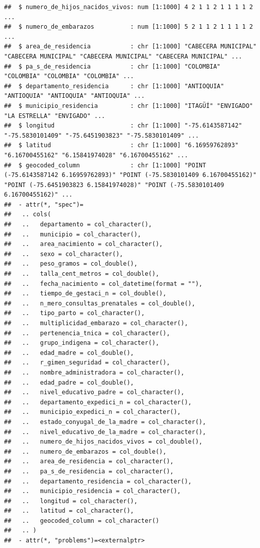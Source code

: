 \documentclass[
]{book}
\begin{document}
\begin{verbatim}
##  $ numero_de_hijos_nacidos_vivos: num [1:1000] 4 2 1 1 2 1 1 1 1 2 ...
##  $ numero_de_embarazos          : num [1:1000] 5 2 1 1 2 1 1 1 1 2 ...
##  $ area_de_residencia           : chr [1:1000] "CABECERA MUNICIPAL" "CABECERA MUNICIPAL" "CABECERA MUNICIPAL" "CABECERA MUNICIPAL" ...
##  $ pa_s_de_residencia           : chr [1:1000] "COLOMBIA" "COLOMBIA" "COLOMBIA" "COLOMBIA" ...
##  $ departamento_residencia      : chr [1:1000] "ANTIOQUIA" "ANTIOQUIA" "ANTIOQUIA" "ANTIOQUIA" ...
##  $ municipio_residencia         : chr [1:1000] "ITAGÜÍ" "ENVIGADO" "LA ESTRELLA" "ENVIGADO" ...
##  $ longitud                     : chr [1:1000] "-75.6143587142" "-75.5830101409" "-75.6451903823" "-75.5830101409" ...
##  $ latitud                      : chr [1:1000] "6.16959762893" "6.16700455162" "6.15841974028" "6.16700455162" ...
##  $ geocoded_column              : chr [1:1000] "POINT (-75.6143587142 6.16959762893)" "POINT (-75.5830101409 6.16700455162)" "POINT (-75.6451903823 6.15841974028)" "POINT (-75.5830101409 6.16700455162)" ...
##  - attr(*, "spec")=
##   .. cols(
##   ..   departamento = col_character(),
##   ..   municipio = col_character(),
##   ..   area_nacimiento = col_character(),
##   ..   sexo = col_character(),
##   ..   peso_gramos = col_double(),
##   ..   talla_cent_metros = col_double(),
##   ..   fecha_nacimiento = col_datetime(format = ""),
##   ..   tiempo_de_gestaci_n = col_double(),
##   ..   n_mero_consultas_prenatales = col_double(),
##   ..   tipo_parto = col_character(),
##   ..   multiplicidad_embarazo = col_character(),
##   ..   pertenencia_tnica = col_character(),
##   ..   grupo_indigena = col_character(),
##   ..   edad_madre = col_double(),
##   ..   r_gimen_seguridad = col_character(),
##   ..   nombre_administradora = col_character(),
##   ..   edad_padre = col_double(),
##   ..   nivel_educativo_padre = col_character(),
##   ..   departamento_expedici_n = col_character(),
##   ..   municipio_expedici_n = col_character(),
##   ..   estado_conyugal_de_la_madre = col_character(),
##   ..   nivel_educativo_de_la_madre = col_character(),
##   ..   numero_de_hijos_nacidos_vivos = col_double(),
##   ..   numero_de_embarazos = col_double(),
##   ..   area_de_residencia = col_character(),
##   ..   pa_s_de_residencia = col_character(),
##   ..   departamento_residencia = col_character(),
##   ..   municipio_residencia = col_character(),
##   ..   longitud = col_character(),
##   ..   latitud = col_character(),
##   ..   geocoded_column = col_character()
##   .. )
##  - attr(*, "problems")=<externalptr>
\end{verbatim}
\end{document}

